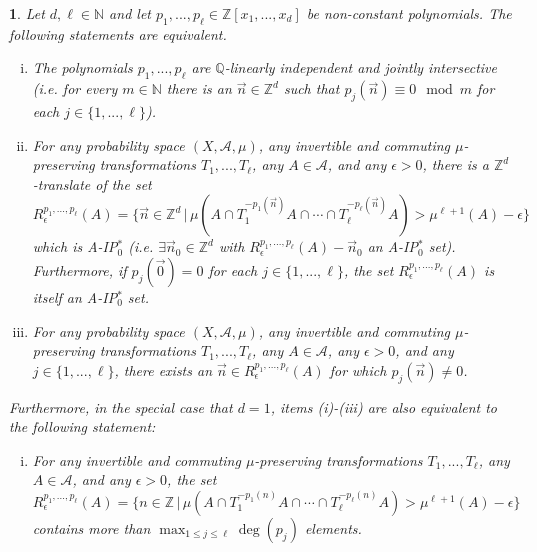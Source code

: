 \documentclass[11pt,american,preprint]{elsarticle}
\numberwithin{equation}{section}
\theoremstyle{plain}
\newtheorem{thm}{\protect\theoremname}[section]
\theoremstyle{plain*}
\theoremstyle{plain}
\theoremstyle{plain*}
\theoremstyle{plain}
\theoremstyle{plain*}
\theoremstyle{remark}
\theoremstyle{remark*}
\theoremstyle{remark}
\theoremstyle{remark*}
\theoremstyle{remark}
\theoremstyle{remark*}
\theoremstyle{plain}
\theoremstyle{definition}
\theoremstyle{plain}
\theoremstyle{plain} %
\providecommand{\theoremname}{Theorem}
\newcommand{\N}{\mathbb{N}}
\newcommand{\Q}{\mathbb{Q}}
\newcommand{\Z}{\mathbb{Z}}
\begin{document}
\begin{thm}\label{0.MainResultLebesgueSpaces} 
    Let $d,\ell\in\N$ and let $p_1,...,p_\ell\in\Z[x_1,...,x_d]$ be non-constant polynomials. The following statements are equivalent. 
    \begin{enumerate}[(i)]
    \item The polynomials $p_1,...,p_\ell$ are $\Q$-linearly independent and jointly intersective (i.e. for every $m\in\N$ there is an $\vec n\in \Z^d$ such that $p_j(\vec n)\equiv0\mod m$ for each $j\in\{1,...,\ell\}$). 
    \item For any probability space $(X,\mathcal A,\mu)$, any invertible and commuting $\mu$-preserving transformations $T_1,...,T_\ell$, any $A\in\mathcal A$, and any $\epsilon>0$, there is a $\Z^d$-translate of the set
    \begin{equation}
        R_\epsilon^{p_1,...,p_\ell}(A)=\{\vec n\in\Z^d\,|\,\mu(A\cap T_1^{-p_1(\vec n)}A\cap \cdots\cap T_\ell^{-p_\ell(\vec n)}A)>\mu^{\ell+1}(A)-\epsilon\}
    \end{equation}
    which is {\rm A-IP$_0^*$} (i.e. $\exists {\vec n_0}\in\Z^d$ with $R_\epsilon^{p_1,...,p_\ell}(A)-{\vec n_0}$ an {\rm A-IP$_0^*$} set). Furthermore, if $p_j(\vec  0)=0$ for each $j\in\{1,...,\ell\}$, the set $R_\epsilon^{p_1,...,p_\ell}(A)$ is itself an {\rm A-IP$_0^*$} set.
        \item For any probability space $(X,\mathcal A,\mu)$,
    any invertible and commuting $\mu$-preserving transformations $T_1,...,T_\ell$, any $A\in\mathcal A$, any $\epsilon>0$, and any $j\in\{1,...,\ell\}$, there exists an $\vec n\in R_\epsilon^{p_1,...,p_\ell}(A)$ for which $p_j(\vec n)\neq 0$.  
\end{enumerate}
Furthermore, in the special case that $d=1$, items (i)-(iii) are also equivalent to the following statement:
\begin{enumerate}[(iv)]
    \item  For any invertible and commuting $\mu$-preserving transformations $T_1,...,T_\ell$, any $A\in\mathcal A$, and any $\epsilon>0$, the set
    \begin{equation}
        R_\epsilon^{p_1,...,p_\ell}(A)=\{n\in\Z\,|\,\mu(A\cap T_1^{-p_1(n)}A\cap \cdots\cap T_\ell^{-p_\ell(n)}A)>\mu^{\ell+1}(A)-\epsilon\}
    \end{equation}
    contains more than $\max_{1\leq j\leq \ell}\deg(p_j)$ elements.
    \end{enumerate}
\end{thm}
\end{document}
